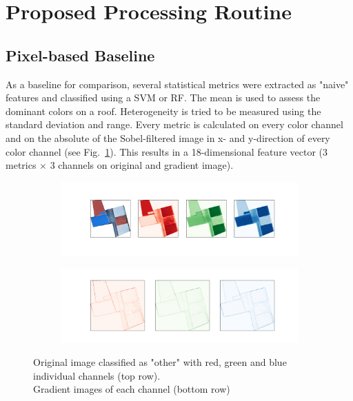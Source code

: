 \documentclass[11pt]{article}
\begin{document}
	
	\section{Proposed Processing Routine}
	
	\subsection{Pixel-based Baseline} 
	\label{sec:pixel_based}
	As a baseline for comparison, several statistical metrics were extracted as "naive" features and classified using a SVM or RF. The mean is used to assess the dominant colors on a roof. Heterogeneity is tried to be measured using the standard deviation and range. Every metric is calculated on every color channel and on the absolute of the Sobel-filtered image in x- and y-direction of every color channel (see Fig.~\ref{fig:pixel_based}). This results in a 18-dimensional feature vector (3 metrics $\times$ 3 channels on original and gradient image).
	
	\begin{figure}
		\centering
		\begin{subfigure}[t]{\textwidth}
			\centering
			\includegraphics[width=\textwidth, trim={3cm 3cm 3cm 3cm},clip]{figures/pixel_based/rgb_channels.png}
		\end{subfigure}
		\begin{subfigure}[b]{.8\textwidth}
			\includegraphics[width=.95\textwidth, trim={2cm 1.5cm 2cm 1.5cm},clip]{figures/pixel_based/sobel.png}
		\end{subfigure}
		\caption{Original image classified as "other" with red, green and blue individual channels (top row). \\ Gradient images of each channel (bottom row)}
		\label{fig:pixel_based}
	\end{figure}
	
\end{document}
